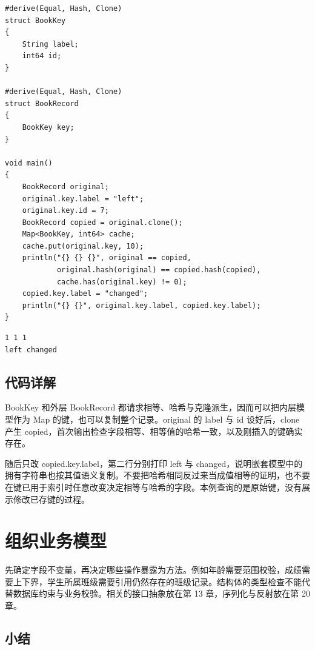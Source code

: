 \par
\medskip
\begin{lstlisting}[style=chali]
#derive(Equal, Hash, Clone)
struct BookKey
{
    String label;
    int64 id;
}

#derive(Equal, Hash, Clone)
struct BookRecord
{
    BookKey key;
}

void main()
{
    BookRecord original;
    original.key.label = "left";
    original.key.id = 7;
    BookRecord copied = original.clone();
    Map<BookKey, int64> cache;
    cache.put(original.key, 10);
    println("{} {} {}", original == copied,
            original.hash(original) == copied.hash(copied),
            cache.has(original.key) != 0);
    copied.key.label = "changed";
    println("{} {}", original.key.label, copied.key.label);
}
\end{lstlisting}
\par
\medskip

\par
\medskip
\begin{lstlisting}[style=out]
1 1 1
left changed
\end{lstlisting}
\par
\medskip

\subsection*{代码详解}

BookKey 和外层 BookRecord 都请求相等、哈希与克隆派生，因而可以把内层模型作为 Map 的键，也可以复制整个记录。original 的 label 与 id 设好后，clone 产生 copied，首次输出检查字段相等、相等值的哈希一致，以及刚插入的键确实存在。

随后只改 copied.key.label，第二行分别打印 left 与 changed，说明嵌套模型中的拥有字符串也按其值语义复制。不要把哈希相同反过来当成值相等的证明，也不要在键已用于索引时任意改变决定相等与哈希的字段。本例查询的是原始键，没有展示修改已存键的过程。

\section{组织业务模型}

先确定字段不变量，再决定哪些操作暴露为方法。例如年龄需要范围校验，成绩需要上下界，学生所属班级需要引用仍然存在的班级记录。结构体的类型检查不能代替数据库约束与业务校验。相关的接口抽象放在第 13 章，序列化与反射放在第 20 章。

\subsection*{小结}

